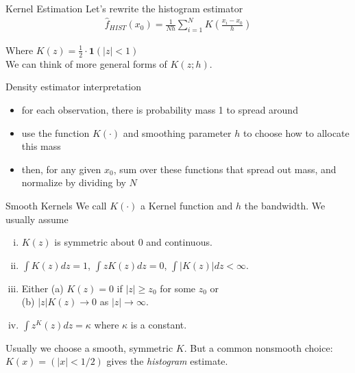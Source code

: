 
\begin{frame}{Kernel Estimation}
  Let's rewrite the histogram estimator
  \begin{eqnarray*}
    \hat{f}_{HIST}(x_0) = \frac{1}{Nh} \sum_{i=1}^N  K \left( \frac{x_i - x_0}{h} \right)
  \end{eqnarray*}

  Where $K(z) = \frac{1}{2} \cdot \mathbf{1} (|z| < 1) $\\[1em]

  We can think of more general forms of $K(z;h)$. 


\end{frame}

\begin{frame}{Density estimator interpretation}
  \begin{itemize}
    \item for each observation, there is probability mass 1 to spread around
    \item use the function $K(\cdot)$ and smoothing parameter $h$ to choose how to allocate this mass
    \item then, for any given $x_0$, sum over these functions that spread out mass, and normalize by dividing by $N$
  \end{itemize}
\end{frame}

\begin{frame}{Smooth Kernels}
  We call $K(\cdot)$ a \alert{Kernel function} and $h$ the \alert{bandwidth}. We usually assume
  \begin{enumerate}[(i)]
  \item $K(z)$ is symmetric about $0$ and continuous.
  \item $\int K(z) d z = 1$,  $\int z K(z) d z = 0$,  $\int |K(z)| d z < \infty$.
  \item Either (a) $K(z) = 0$ if $|z| \geq z_0$ for some $z_0$ or \\
  (b) $|z| K(z) \rightarrow 0$ as $|z| \rightarrow \infty$.
  \item $\int z^ K(z) d z = \kappa$ where $\kappa$ is a constant.
  \end{enumerate}

  \pause
  
  \bigskip

  Usually we choose a smooth, symmetric $K$. But a common nonsmooth choice: $K(x)=(|x|<1/2)$ gives the {\em histogram} estimate.

\end{frame}
 

